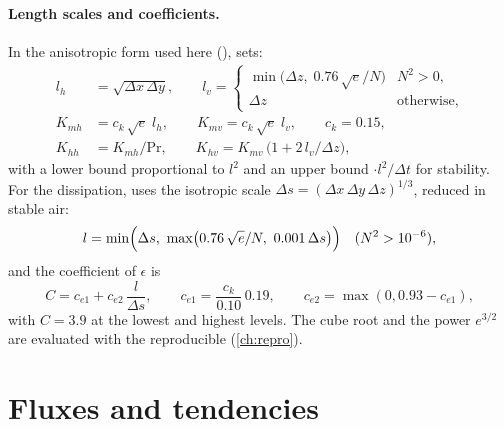 \paragraph{Length scales and coefficients.} In the anisotropic form used here (),
 sets:
\begin{align}
  l_h &= \sqrt{\Delta x\,\Delta y}, \qquad
  l_v = \begin{cases} \min\bigl(\Delta z,\; 0.76\,\sqrt{e}/N\bigr) & N^2 > 0,\\ \Delta z & \text{otherwise},\end{cases}\\
  K_{mh} &= c_k\,\sqrt{e}\;l_h, \qquad K_{mv} = c_k\,\sqrt{e}\;l_v, \qquad c_k = 0.15,\\
  K_{hh} &= K_{mh}/\mathrm{Pr}, \qquad K_{hv} = K_{mv}\,\bigl(1 + 2\,l_v/\Delta z\bigr),
\end{align}
with a lower bound proportional to $l^2$ and an upper bound $\cdot l^2/\Delta t$ for
stability. For the dissipation,  uses the isotropic scale
$\Delta s = (\Delta x\,\Delta y\,\Delta z)^{1/3}$, reduced in stable air:
\begin{equation}
  l = \min\Bigl(\Delta s,\ \max\bigl(0.76\,\sqrt{e}/N,\ 0.001\,\Delta s\bigr)\Bigr) \quad (N^2 > 10^{-6}),
\end{equation}
and the coefficient of $\epsilon$ is
\begin{equation}
  C = c_{e1} + c_{e2}\,\frac{l}{\Delta s}, \qquad c_{e1} = \frac{c_k}{0.10}\,0.19, \qquad c_{e2} = \max(0, 0.93 - c_{e1}),
\end{equation}
with $C = 3.9$ at the lowest and highest levels. The cube root and the power $e^{3/2}$ are evaluated with the
reproducible  (\cref{ch:repro}).

\section{Fluxes and tendencies}


